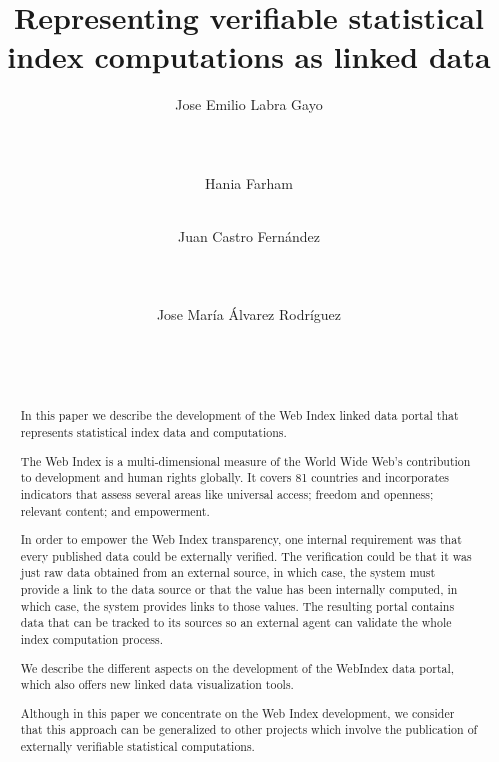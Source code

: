 \documentclass{acm_proc_article-sp}
\begin{document}
\title{Representing verifiable statistical index computations as linked data}

\author{
\alignauthor
Jose Emilio Labra Gayo\\
       \\
       \\
       \\
\alignauthor
Hania Farham\\
       \\
\and
\alignauthor
Juan Castro Fernández\\
        \\
       \\
       \\
\alignauthor
Jose María Álvarez Rodríguez\\
        \\
       \\
       \\
}

\maketitle
\begin{abstract}

In this paper we describe the development of the Web Index linked data portal that represents statistical index data and computations. 

The Web Index is a multi-dimensional measure of the World Wide Web’s contribution to development and human rights globally. It covers 81 countries and incorporates indicators that assess several areas like universal access; freedom and openness; relevant content; and empowerment.

In order to empower the Web Index transparency, one internal requirement was that every published data could be externally verified. 
The verification could be that it was just raw data obtained from an external source, in which case, the system must provide a link to the data source or that the value has been internally computed, 
 in which case, the system provides links to those values.
The resulting portal contains data that can be tracked to its sources so an external agent
can validate the whole index computation process.

We describe the different aspects on the development of the WebIndex data portal, which also offers new linked data visualization tools. 

Although in this paper we concentrate on the Web Index development, 
we consider that this approach can be generalized to other projects which involve 
 the publication of externally verifiable statistical computations.
\end{abstract}
\end{document}
